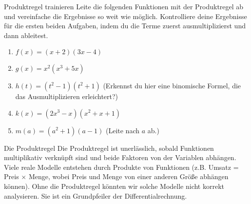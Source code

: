 \begin{aufgabenumgebung}{Produktregel trainieren}
Leite die folgenden Funktionen mit der Produktregel ab und vereinfache die Ergebnisse so weit wie möglich. Kontrolliere deine Ergebnisse für die ersten beiden Aufgaben, indem du die Terme zuerst ausmultiplizierst und dann ableitest.
\begin{enumerate}
    \item $f(x) = (x+2)(3x-4)$
    \item $g(x) = x^2(x^3+5x)$
    \item $h(t) = (t^2-1)(t^2+1)$ (Erkennst du hier eine binomische Formel, die das Ausmultiplizieren erleichtert?)
    \item $k(x) = (2x^3-x)(x^2+x+1)$
    \item $m(a) = (a^2+1)(a-1)$ (Leite nach $a$ ab.)
\end{enumerate}
\end{aufgabenumgebung}

\begin{warumwichtigumgebung}{Die Produktregel}
Die Produktregel ist unerlässlich, sobald Funktionen multiplikativ verknüpft sind und beide Faktoren von der Variablen abhängen. Viele reale Modelle entstehen durch Produkte von Funktionen (z.B. Umsatz = Preis $\times$ Menge, wobei Preis und Menge von einer anderen Größe abhängen können). Ohne die Produktregel könnten wir solche Modelle nicht korrekt analysieren. Sie ist ein Grundpfeiler der Differentialrechnung.
\end{warumwichtigumgebung}



